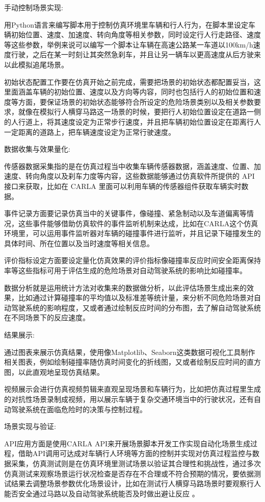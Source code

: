 手动控制场景实现:

用Python语言来编写脚本用于控制仿真环境里车辆和行人行为，在脚本里设定车辆初始位置、速度、加速度、转向角度等相关参数，同时设定行人行走路径、速度等这些参数，举例来说可以编写一个脚本让车辆在高速公路某一车道以100km/h速度行驶，之后在某一时刻让其突然急刹车，并且让另一辆车以更高速度从后方驶来以此模拟追尾场景\cite{师圣蔓2019基于机器学习的网络流量预测与应用研究}。

初始状态配置工作要在仿真开始之前完成，需要把场景的初始状态都配置妥当，这里面涵盖车辆的初始位置、速度以及方向等内容，同时也包括行人的初始位置和速度等方面，要保证场景的初始状态能够符合所设定的危险场景类别以及相关参数要求，就像在模拟行人横穿马路这一场景的时候，要把行人初始位置设定在道路一侧的人行道上，将其速度设定为正常步行速度，并且把车辆初始位置设定在距离行人一定距离的道路上，把车辆速度设定为正常行驶速度\cite{靳小波0基于机器学习算法的文本分类系统}。


数据收集与效果量化:

传感器数据采集指的是在仿真过程当中收集车辆传感器数据，涵盖速度、位置、加速度、转向角度以及刹车力度等内容，这些数据能够通过仿真软件所提供的 API 接口来获取，比如在 CARLA 里面可以利用车辆的传感器组件获取车辆实时数据\cite{ke2017lightgbm}。

事件记录方面要记录仿真当中的关键事件，像碰撞、紧急制动以及车道偏离等情况，这些事件能够借助仿真软件的事件监听机制来达成，比如在CARLA这个仿真环境里，可以运用事件监听器对车辆的碰撞事件进行监听，并且记录下碰撞发生的具体时间、所在位置以及当时速度等相关信息。

评价指标设定方面要设定量化仿真效果的评价指标像碰撞率反应时间安全距离保持率等这些指标可用于评估生成的危险场景对自动驾驶系统的影响比如碰撞率。

数据分析就是运用统计方法对收集来的数据做分析，以此评估场景生成出来的效果，比如通过计算碰撞率的平均值以及标准差等统计量，来分析不同危险场景对自动驾驶系统的影响程度，又或者通过绘制反应时间的分布图，去了解自动驾驶系统在不同场景下的反应速度。

结果展示:

通过图表来展示仿真结果，使用像Matplotlib、Seaborn这类数据可视化工具制作相关图表，例如绘制碰撞率随仿真时间变化的折线图，又或者绘制反应时间的直方图，以此直观地呈现仿真结果。

视频展示会进行仿真视频剪辑来直观呈现场景和车辆行为，比如把仿真过程里生成的对抗性场景录制成视频，用以展示车辆于复杂交通环境当中的行驶状况，还有自动驾驶系统在面临危险时的决策与控制过程。

场景实现与验证:

API应用方面是使用CARLA API来开展场景脚本开发工作实现自动化场景生成过程，借助API调用可达成对车辆行人环境等方面的控制并实现对仿真过程监控与数据采集，仿真测试则是在仿真环境里测试场景以验证其合理性和挑战性，通过多次仿真测试来观察场景运行状况检查是否存在不合理或不符合预期的情况，要依据测试结果去调整场景参数优化场景设计，比如在测试行人横穿马路场景时要观察行人能否安全通过马路以及自动驾驶系统能否及时做出避让反应\cite{刘彧祺2019基于} 。

